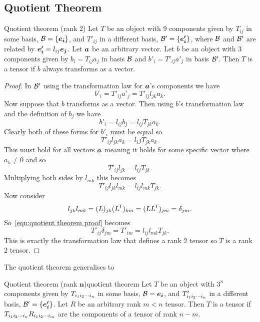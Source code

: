 \subsection{Quotient Theorem}
\begin{theorem}{Quotient theorem (rank 2)}{}
    Let \(T\) be an object with 9 components given by \(T_{ij}\) in some basis, \(\mathcal{B} = \{\bm{e_{i}}\}\), and \(T'_{ij}\) in a different basis, \(\mathcal{B}' = \{\bm{e'_{i}}\}\), where \(\mathcal{B}\)  and \(\mathcal{B}'\) are related by \(\bm{e'_{i}} = l_{ij}\bm{e_{j}}\).
    Let \(\bm{a}\) be an arbitrary vector.
    Let \(b\) be an object with \(3\) components given by \(b_i = T_{ij}a_j\) in basis \(\mathcal{B}\) and \(b'_i = T'_{ij}a'_j\) in basis \(\mathcal{B}'\).
    Then \(T\) is a tensor if \(b\) always transforms as a vector.
\end{theorem}
\begin{proof}
    In \(\mathcal{B}'\) using the transformation law for \(\bm{a}\)'s components we have
    \[b'_{i} = T'_{ij}a'_j = T'_{ij}l_{jk}a_k.\]
    Now suppose that \(b\) transforms as a vector.
    Then using \(b\)'s transformation law and the definition of \(b_j\) we have
    \[b'_i = l_{ij}b_j = l_{ij}T_{jk}a_k.\]
    Clearly both of these forms for \(b'_i\) must be equal so
    \[T'_{ij}l_{jk}a_k = l_ijT_{jk}a_k.\]
    This must hold for all vectors \(\bm{a}\) meaning it holds for some specific vector where \(a_k \ne 0\) and so
    \[T'_{ij}l_{jk} = l_{ij}T_{jk}.\]
    Multiplying both sides by \(l_{mk}\) this becomes
    \begin{equation}\label{eqn:quotient theorem proof}
        T'_{ij}l_{jk}l_{mk} = l_{ij}l_{mk}T_{jk}.
    \end{equation}
    Now consider
    \[l_{jk}l_{mk} = (L)_{jk}(L^{\mkern-1.5mu\mathsf{T}})_{km} = (LL^{\mkern-1.5mu\mathsf{T}})_{jm} = \delta_{jm}.\]
    So~\ref{eqn:quotient theorem proof} becomes
    \[T'_{ij}\delta_{jm} = T'_{im} = l_{ij}l_{mk}T_{jk}.\]
    This is exactly the transformation law that defines a rank 2 tensor so \(T\) is a rank 2 tensor.
\end{proof}

The quotient theorem generalises to
\begin{theorem}{Quotient theorem (rank \(\bm{n}\))}{quotient theorem}
    Let \(T\) be an object with \(3^n\) components given by \(T_{{ {i}_1 {i}_2 \dotsm {i}_{n} }}\) in some basis, \(\mathcal{B} = {\bm{e_{i}}}\), and \(T'_{{ {i}_1 {i}_2 \dotsm {i}_{n} }}\) in a different basis, \(\mathcal{B}' = \{\bm{e'_{i}}\}\).
    Let \(R\) be an arbitrary rank \(m < n\) tensor.
    Then \(T\) is a tensor if \(T_{{ {i}_1 {i}_2 \dotsm {i}_{n} }}R_{{ {i}_1 {i}_2 \dotsm {i}_{m} }}\) are the components of a tensor of rank \(n - m\).
\end{theorem}

